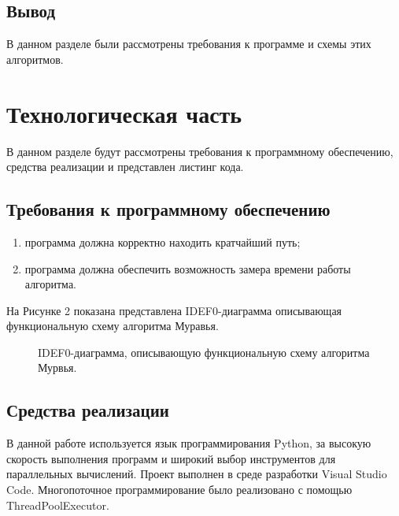 \documentclass[a4paper, 12pt]{article}
\begin{document}
	\subsection{Вывод}
	\hspace*{5mm} В данном разделе были рассмотрены требования к программе и схемы этих алгоритмов. 


\newpage
\section{Технологическая часть}

	\hspace*{5mm} В данном разделе будут рассмотрены требования к программному обеспечению, средства реализации и представлен листинг кода.
	\subsection{Требования к программному обеспечению}
		\begin{enumerate}
		\item программа должна корректно находить кратчайший путь;
		\item программа должна обеспечить возможность замера времени работы алгоритма. 
	\end{enumerate}
	На Рисунке 2 показана представлена IDEF0-диаграмма описывающая функциональную схему алгоритма Муравья.
	\begin{figure}[h]
		\caption{IDEF0-диаграмма, описывающую функциональную схему алгоритма Мурвья.}
		\label{fig:ant}
	\end{figure}
	\subsection{Средства реализации}
	\hspace*{5mm} В данной работе используется язык программирования Python, за высокую скорость выполнения программ и широкий выбор инструментов для параллельных вычислений.\cite{doc} Проект выполнен в среде разработки Visual Studio Code. Многопоточное программирование было реализовано с помощью ThreadPoolExecutor.\cite{paral} 
	\clearpage
	\newpage 
\end{document}
